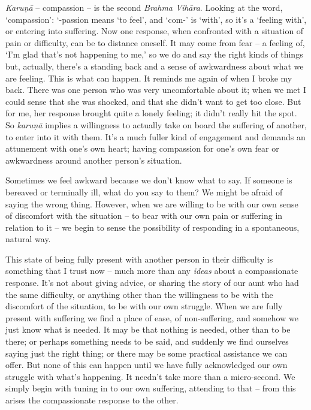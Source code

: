 \textit{Karu\d{n}\=a} -- compassion -- is the second \textit{Brahma Vih\=ara}. Looking at the word, `compassion': `-passion means `to feel', and `com-' is `with', so it's a `feeling with', or entering into suffering. Now one response, when confronted with a situation of pain or difficulty, can be to distance oneself. It may come from fear -- a feeling of, `I'm glad that's not happening to me,' so we do and say the right kinds of things but, actually, there's a standing back and a sense of awkwardness about what we are feeling. This is what can happen. It reminds me again of when I broke my back. There was one person who was very uncomfortable about it; when we met I could sense that she was shocked, and that she didn't want to get too close. But for me, her response brought quite a lonely feeling; it didn't really hit the spot. So \textit{karu\d{n}\=a} implies a willingness to actually take on board the suffering of another, to enter into it with them. It's a much fuller kind of engagement and demands an attunement with one's own heart; having compassion for one's own fear or awkwardness around another person's situation. 

Sometimes we feel awkward because we don't know what to say. If someone is bereaved or terminally ill, what do you say to them? We might be afraid of saying the wrong thing. However, when we are willing to be with our own sense of discomfort with the situation -- to bear with our own pain or suffering in relation to it -- we begin to sense the possibility of responding in a spontaneous, natural way.

This state of being fully present with another person in their difficulty is something that I trust now -- much more than any \textit{ideas} about a compassionate response. It's not about giving advice, or sharing the story of our aunt who had the same difficulty, or anything other than the willingness to be with the discomfort of the situation, to be with our own struggle. When we are fully present with suffering we find a place of ease, of non-suffering, and somehow we just know what is needed. It may be that nothing is needed, other than to be there; or perhaps something needs to be said, and suddenly we find ourselves saying just the right thing; or there may be some practical assistance we can offer. But none of this can happen until we have fully acknowledged our own struggle with what's happening. It needn't take more than a micro-second. We simply begin with tuning in to our own suffering, attending to that -- from this arises the compassionate response to the other.

